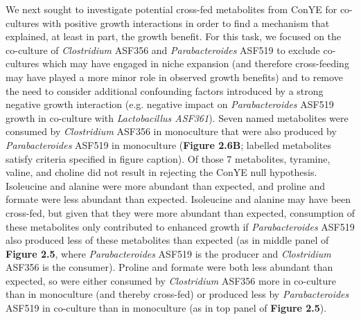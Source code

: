 \documentclass[11pt,twocolumn,notitlepage,openany,twoside]{book}
\begin{document}
\begin{refsection}
We next sought to investigate potential cross-fed metabolites from ConYE for co-cultures with positive growth interactions in order to find a mechanism that explained, at least in part, the growth benefit. For this task, we focused on the co-culture of \textit{Clostridium} ASF356 and \textit{Parabacteroides} ASF519 to exclude co-cultures which may have engaged in niche expansion (and therefore cross-feeding may have played a more minor role in observed growth benefits) and to remove the need to consider additional confounding factors introduced by a strong negative growth interaction (e.g. negative impact on \textit{Parabacteroides} ASF519 growth in co-culture with \textit{Lactobacillus ASF361}). Seven named metabolites were consumed by \textit{Clostridium} ASF356 in monoculture that were also produced by \textit{Parabacteroides} ASF519 in monoculture (\textbf{Figure 2.6B}; labelled metabolites satisfy criteria specified in figure caption). Of those 7 metabolites, tyramine, valine, and choline did not result in rejecting the ConYE null hypothesis. Isoleucine and alanine were more abundant than expected, and proline and formate were less abundant than expected. Isoleucine and alanine may have been cross-fed, but given that they were more abundant than expected, consumption of these metabolites only contributed to enhanced growth if \textit{Parabacteroides} ASF519 also produced less of these metabolites than expected (as in middle panel of \textbf{Figure 2.5}, where \textit{Parabacteroides} ASF519 is the producer and \textit{Clostridium} ASF356 is the consumer). Proline and formate were both less abundant than expected, so were either consumed by \textit{Clostridium} ASF356 more in co-culture than in monoculture (and thereby cross-fed) or produced less by \textit{Parabacteroides} ASF519 in co-culture than in monoculture (as in top panel of \textbf{Figure 2.5}).


\end{refsection}
\end{document}

